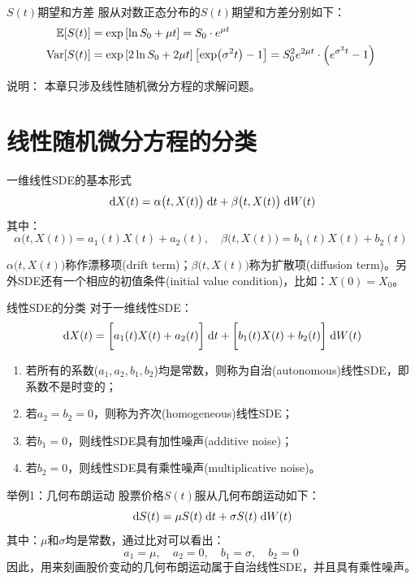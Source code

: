 \documentclass[t]{beamer}
\newcommand{\dif}{{\;\rm d}}
\newcommand{\E}{\mathbb{E}}
\newcommand{\Var}{{\rm Var}}
\begin{document}
\begin{frame}{$S(t)$期望和方差}
服从对数正态分布的$S(t)$期望和方差分别如下：
\[\begin{split}
\E[S(t)]&=\exp\left[\ln S_0+\mu t \right]=S_0\cdot e^{\mu t}\\
\Var[S(t)]&=\exp\left[2\ln S_0+2\mu t \right]\left[\exp(\sigma^2 t)-1\right]=S^2_0 e^{2\mu t}\cdot \left(e^{\sigma^2 t}-1\right) 
\end{split} \]

\begin{block}{说明：}
本章只涉及线性随机微分方程的求解问题。
\end{block}
\end{frame}

\section{线性随机微分方程的分类}
\begin{frame}{一维线性SDE的基本形式}
\begin{equation*}
\dif X(t)=\alpha \big(t,X(t)\big)\dif t+\beta\big(t,X(t)\big)\dif W(t)
\end{equation*}
其中：$$\alpha \big(t,X(t)\big)=a_1(t)X(t)+a_2(t),\quad \beta \big(t,X(t)\big)=b_1(t)X(t)+b_2(t)$$

$\alpha \big(t,X(t)\big)$称作漂移项(drift term)；$\beta \big(t,X(t)\big)$称为扩散项(diffusion term)。另外SDE还有一个相应的初值条件(initial value condition)，比如：$X(0)=X_0$。
\end{frame}

\begin{frame}{线性SDE的分类}
对于一维线性SDE：
\[\dif X(t)=\bigg[a_1(t)X(t)+a_2(t)\bigg]\dif t+\bigg[b_1(t)X(t)+b_2(t)\bigg]\dif W(t)\]

\begin{enumerate}
\item 若所有的系数($a_1,a_2,b_1,b_2$)均是常数，则称为自治(autonomous)线性SDE，即系数不是时变的；
\item 若$a_2=b_2=0$，则称为齐次(homogeneous)线性SDE；
\item 若$b_1=0$，则线性SDE具有加性噪声(additive noise)；
\item 若$b_2=0$，则线性SDE具有乘性噪声(multiplicative noise)。
\end{enumerate}
\end{frame}

\begin{frame}{举例1：几何布朗运动}
股票价格$S(t)$服从几何布朗运动如下：
\[\dif S(t)=\mu S(t)\dif t+\sigma S(t) \dif W(t) \]
其中：$\mu$和$\sigma$均是常数，通过比对可以看出：
\[a_1=\mu,\quad a_2=0,\quad b_1=\sigma,\quad b_2=0 \]
因此，用来刻画股价变动的几何布朗运动属于自治线性SDE，并且具有乘性噪声。
\end{frame}
\end{document}
